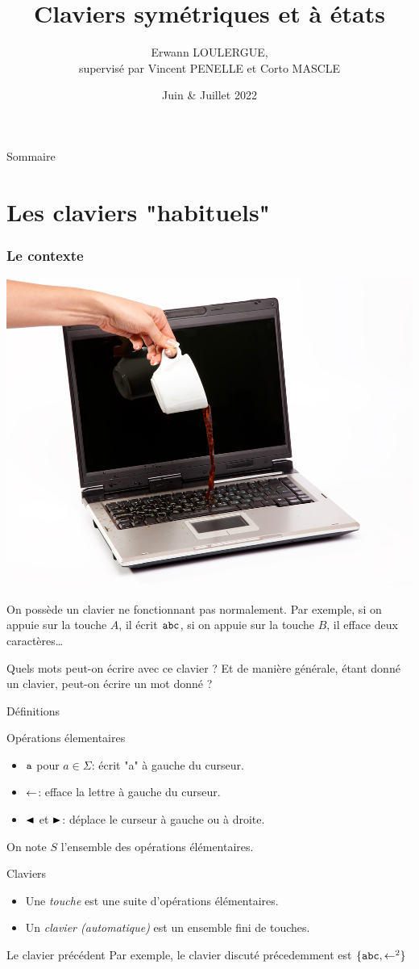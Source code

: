 \documentclass[11pt,french,professionalfonts]{beamer}
\title{Claviers symétriques et à états}
\author[Erwann LOULERGUE]{Erwann LOULERGUE, \texorpdfstring{\\supervisé par Vincent PENELLE et Corto MASCLE}{}}
\date{Juin \& Juillet 2022}
\institute[ENS Paris-Saclay]{Au LaBRI}
\begin{document}
\begin{frame}
	\titlepage
\end{frame}

\begin{frame}{Sommaire}
	\tableofcontents
\end{frame}

\section{Les claviers "habituels"}
\begin{frame}
	\frametitle{Le contexte}
	\begin{center}
		\includegraphics[height=0.3\textwidth]{Drame.jpg}	
	\end{center}

	On possède un clavier ne fonctionnant pas normalement. Par exemple, si on appuie sur la touche $A$, il écrit $\mathtt{abc}$, si on appuie sur la touche $B$, il efface deux caractères\dots

	Quels mots peut-on écrire avec ce clavier ? Et de manière générale, étant donné un clavier, peut-on écrire un mot donné ?

\end{frame}
\begin{frame}{Définitions}
	\begin{block}{Opérations élementaires}
		\begin{itemize}
			\item $\mathtt{a}$ pour $a \in \Sigma$: écrit "a" à gauche du curseur. \pause
			\item $\mathord{\leftarrow}$: efface la lettre à gauche du curseur. \pause
			\item $\mathord{\blacktriangleleft}$ et $\mathord{\blacktriangleright}$: déplace le curseur à gauche ou à droite.
		\end{itemize}
	\end{block}
	\vspace{-8pt}
	On note $S$ l'ensemble des opérations élémentaires.
	\pause
	\begin{block}{Claviers}
		\begin{itemize}
			\item Une \emph{touche} est une suite d'opérations élémentaires. \pause
			\item Un \emph{clavier (automatique)} est un ensemble fini de touches.
		\end{itemize}
	\end{block}
	\begin{exampleblock}{Le clavier précédent}
		Par exemple, le clavier discuté précedemment est $\{\mathtt{abc},\mathord{\leftarrow}^2\}$
	\end{exampleblock}
\end{frame}
\end{document}
